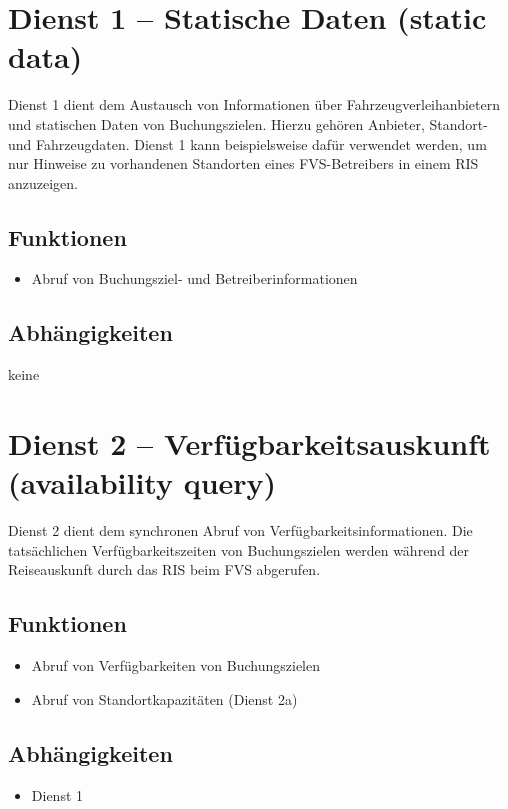 \section{Dienst 1 -- Statische Daten (static data)}
\label{sec:Hierachiemodell:Dienst1}

Dienst 1 dient dem Austausch von Informationen über Fahrzeugverleihanbietern und statischen Daten von Buchungszielen. Hierzu gehören Anbieter, Standort- und Fahrzeugdaten. Dienst 1 kann beispielsweise dafür verwendet werden, um nur Hinweise zu vorhandenen Standorten eines FVS-Betreibers in einem RIS anzuzeigen.

\subsection*{Funktionen}
\begin{itemize}
\item Abruf von Buchungsziel- und Betreiberinformationen
\end{itemize}

\subsection*{Abhängigkeiten}
keine 

\section{Dienst 2 -- Verfügbarkeitsauskunft (availability query) }
\label{sec:Hierachiemodell:Dienst2}
Dienst 2 dient dem synchronen Abruf von Verfügbarkeitsinformationen. Die tatsächlichen Verfügbarkeitszeiten von Buchungszielen werden während der Reiseauskunft durch das RIS beim FVS abgerufen. 

\subsection*{Funktionen}
\begin{itemize}
\item Abruf von Verfügbarkeiten von Buchungszielen
\item Abruf von Standortkapazitäten (Dienst 2a)
\end{itemize}

\subsection*{Abhängigkeiten}
\begin{itemize}
\item Dienst 1
\end{itemize}

